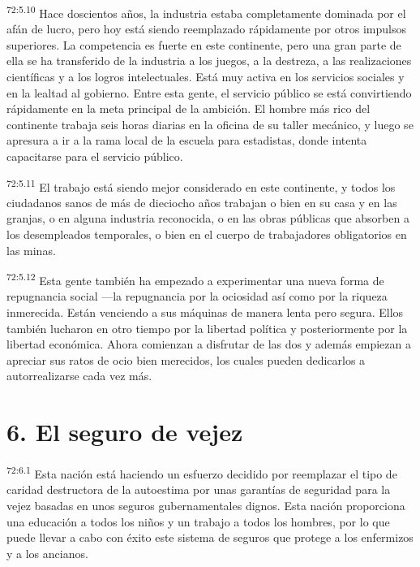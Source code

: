 \par
\textsuperscript{72:5.10} Hace doscientos años, la industria estaba completamente dominada por el afán de lucro, pero hoy está siendo reemplazado rápidamente por otros impulsos superiores. La competencia es fuerte en este continente, pero una gran parte de ella se ha transferido de la industria a los juegos, a la destreza, a las realizaciones científicas y a los logros intelectuales. Está muy activa en los servicios sociales y en la lealtad al gobierno. Entre esta gente, el servicio público se está convirtiendo rápidamente en la meta principal de la ambición. El hombre más rico del continente trabaja seis horas diarias en la oficina de su taller mecánico, y luego se apresura a ir a la rama local de la escuela para estadistas, donde intenta capacitarse para el servicio público.

\par
\textsuperscript{72:5.11} El trabajo está siendo mejor considerado en este continente, y todos los ciudadanos sanos de más de dieciocho años trabajan o bien en su casa y en las granjas, o en alguna industria reconocida, o en las obras públicas que absorben a los desempleados temporales, o bien en el cuerpo de trabajadores obligatorios en las minas.

\par
\textsuperscript{72:5.12} Esta gente también ha empezado a experimentar una nueva forma de repugnancia social ---la repugnancia por la ociosidad así como por la riqueza inmerecida. Están venciendo a sus máquinas de manera lenta pero segura. Ellos también lucharon en otro tiempo por la libertad política y posteriormente por la libertad económica. Ahora comienzan a disfrutar de las dos y además empiezan a apreciar sus ratos de ocio bien merecidos, los cuales pueden dedicarlos a autorrealizarse cada vez más.

\section*{6. El seguro de vejez}
\par
\textsuperscript{72:6.1} Esta nación está haciendo un esfuerzo decidido por reemplazar el tipo de caridad destructora de la autoestima por unas garantías de seguridad para la vejez basadas en unos seguros gubernamentales dignos. Esta nación proporciona una educación a todos los niños y un trabajo a todos los hombres, por lo que puede llevar a cabo con éxito este sistema de seguros que protege a los enfermizos y a los ancianos.

